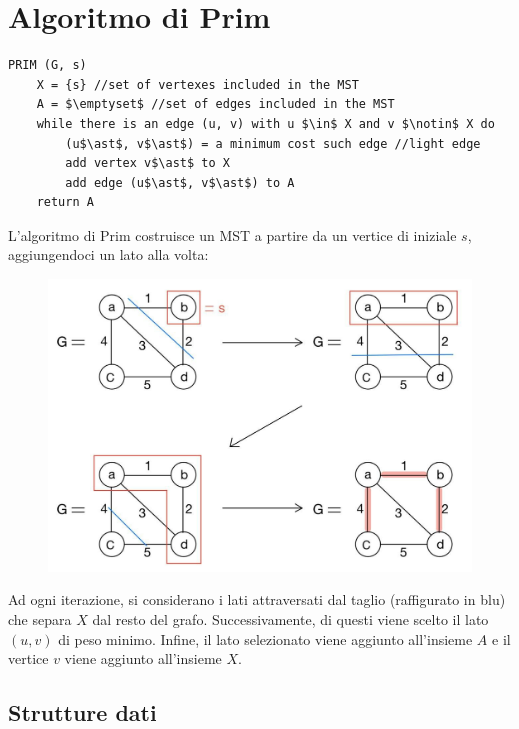 \section{Algoritmo di Prim}\label{prim}

\begin{lstlisting}[mathescape=true]
PRIM (G, s)
	X = {s} //set of vertexes included in the MST
	A = $\emptyset$ //set of edges included in the MST
	while there is an edge (u, v) with u $\in$ X and v $\notin$ X do
		(u$\ast$, v$\ast$) = a minimum cost such edge //light edge
		add vertex v$\ast$ to X
		add edge (u$\ast$, v$\ast$) to A
	return A	

\end{lstlisting}

L'algoritmo di Prim costruisce un MST a partire da un vertice di iniziale $s$, aggiungendoci un lato alla volta:

\begin{figure}[H]
	\centering\includegraphics[width=15cm]{Img/prim.jpg}
\end{figure}

Ad ogni iterazione, si considerano i lati attraversati dal taglio (raffigurato in blu) che separa $X$ dal resto del grafo. 
Successivamente, di questi viene scelto il lato $(u, v)$ di peso minimo. 
Infine, il lato selezionato viene aggiunto all'insieme $A$ e il vertice $v$ viene aggiunto all'insieme $X$.

\subsection{Strutture dati}
	
